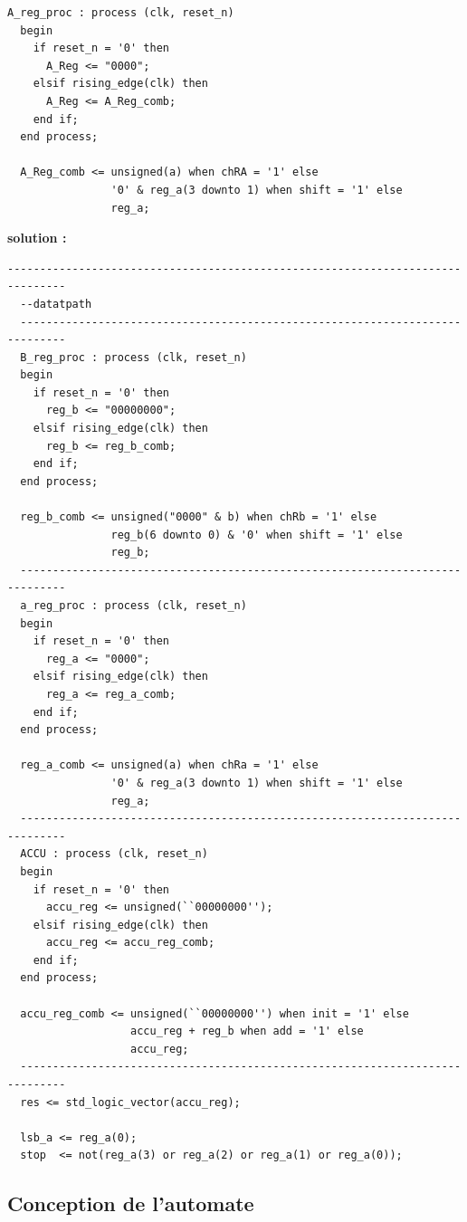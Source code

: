 \documentclass[a4paper,11pt]{article}
\begin{document}
\begin{lstlisting}[caption=registre A et logique combinatoire associée, label=amb]
A_reg_proc : process (clk, reset_n)
  begin
    if reset_n = '0' then
      A_Reg <= "0000";
    elsif rising_edge(clk) then
      A_Reg <= A_Reg_comb;
    end if;
  end process;

  A_Reg_comb <= unsigned(a) when chRA = '1' else
                '0' & reg_a(3 downto 1) when shift = '1' else
                reg_a;
\end{lstlisting}

{\bf solution :}

\begin{lstlisting}[caption=registre B]
 -------------------------------------------------------------------------------
  --datatpath
  -----------------------------------------------------------------------------
  B_reg_proc : process (clk, reset_n)
  begin
    if reset_n = '0' then
      reg_b <= "00000000";
    elsif rising_edge(clk) then
      reg_b <= reg_b_comb;
    end if;
  end process;

  reg_b_comb <= unsigned("0000" & b) when chRb = '1' else
                reg_b(6 downto 0) & '0' when shift = '1' else
                reg_b;
  -----------------------------------------------------------------------------
  a_reg_proc : process (clk, reset_n)
  begin
    if reset_n = '0' then
      reg_a <= "0000";
    elsif rising_edge(clk) then
      reg_a <= reg_a_comb;
    end if;
  end process;

  reg_a_comb <= unsigned(a) when chRa = '1' else
                '0' & reg_a(3 downto 1) when shift = '1' else
                reg_a;
  -----------------------------------------------------------------------------
  ACCU : process (clk, reset_n)
  begin
    if reset_n = '0' then
      accu_reg <= unsigned(``00000000'');
    elsif rising_edge(clk) then
      accu_reg <= accu_reg_comb;
    end if;
  end process;

  accu_reg_comb <= unsigned(``00000000'') when init = '1' else
                   accu_reg + reg_b when add = '1' else
                   accu_reg;
  -----------------------------------------------------------------------------
  res <= std_logic_vector(accu_reg);

  lsb_a <= reg_a(0);
  stop  <= not(reg_a(3) or reg_a(2) or reg_a(1) or reg_a(0));

\end{lstlisting}


\subsection{Conception de l'automate}
\end{document}
